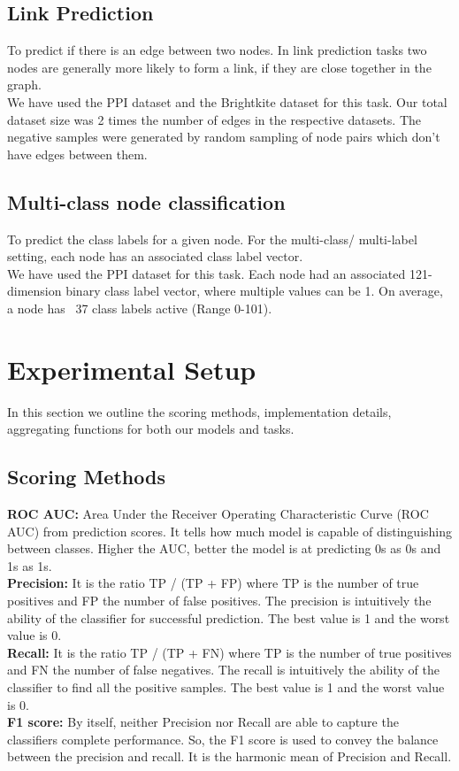 \documentclass[sigconf]{acmart}
\begin{document}
\subsection{Link Prediction}
To predict if there is an edge between two nodes. In link prediction tasks two nodes are generally more likely to form a link, if they are close together in the graph. \\
We have used the PPI dataset \cite{Zitnik2017} and the Brightkite dataset \cite{cho2011friendship} for this task. Our total dataset size was 2 times the number of edges in the respective datasets. The negative samples were generated by random sampling of node pairs which don't have edges between them. 

\subsection{Multi-class node classification}
To predict the class labels for a given node. For the multi-class/ multi-label setting, each node has an associated class label vector. \\
We have used the PPI dataset \cite{Zitnik2017} for this task. Each node had an associated 121-dimension binary class label vector, where multiple values can be 1. On average, a node has ~37 class labels active (Range 0-101).


\section{Experimental Setup}

In this section we outline the scoring methods, implementation details, aggregating functions for both our models and tasks.

\subsection{Scoring Methods}
\textbf{ROC AUC:} Area Under the Receiver Operating Characteristic Curve (ROC AUC) from prediction scores.  It tells how much model is capable of distinguishing between classes. Higher the AUC, better the model is at predicting 0s as 0s and 1s as 1s.
\\
\textbf{Precision:} It is the ratio TP / (TP + FP) where TP is the number of true positives and FP the number of false positives. The precision is intuitively the ability of the classifier for successful prediction. The best value is 1 and the worst value is 0.
\\
\textbf{Recall:} It is the ratio TP / (TP + FN) where TP is the number of true positives and FN the number of false negatives. The recall is intuitively the ability of the classifier to find all the positive samples. The best value is 1 and the worst value is 0.
\\
\textbf{F1 score:} By itself, neither Precision nor Recall are able to capture the classifiers complete performance. So, the F1 score is used to convey the balance between the precision and recall. It is the harmonic mean of Precision and Recall. 
\end{document}
